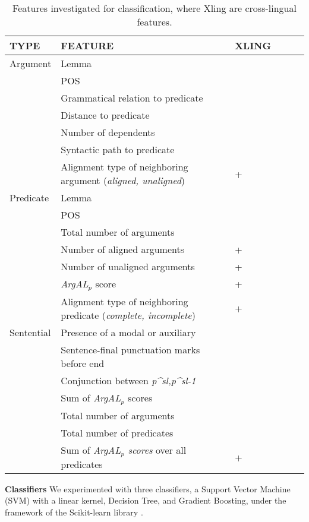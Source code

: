 \documentclass[11pt]{article}
\begin{document}
\begin {table}[h]
\begin{tabular}{@{}p{1.5cm}p{4.3cm}llrc@{}}
\hline
\tiny TYPE  & \tiny FEATURE & \tiny XLING \\
\hline
\small Argument &  \small Lemma\\
\small    & \small POS\\
\small   & \small Grammatical relation to predicate\\
\small      & \small Distance to predicate\\
\small      & \small Number of dependents\\
\small      & \small Syntactic path to predicate\\
\small       & \small Alignment type of neighboring argument ({\em aligned, unaligned}) & \tiny +\\
\hline
\small Predicate &  \small Lemma\\
\small     & \small POS\\
\small     & \small Total number of arguments\\
\small      & \small Number of aligned arguments & \tiny +\\
\small      & \small Number of unaligned arguments & \tiny +\\
\small      & \small \textit{ArgAL$_p$} score & \tiny +\\
\small    & \small Alignment type of neighboring predicate ({\em complete, incomplete}) & \tiny +\\
\hline
\small Sentential     & \small   Presence of a modal or auxiliary  \\
\small    & \small   Sentence-final punctuation marks before end \\
\small      & \small   Conjunction between  \small \textit{p^{sl},p^{sl}-1} \\
\small      & \small   Sum of  \small \textit{ArgAL$_p$} scores  \\
\small      & \small   Total number of arguments  \\
\small      & \small   Total number of predicates  \\
\small      & \small   Sum of  \small \textit{ArgAL$_p$ scores} over all predicates & \tiny +\\
\hline
\end{tabular}
\caption{Features investigated for classification, where Xling are cross-lingual features.}\label{features}
\end{table}

{\bf  \flushleft Classifiers}
We experimented with three classifiers, a Support Vector Machine (SVM) with a linear kernel, Decision Tree, and Gradient Boosting, under the framework of the Scikit-learn library \cite{scikit-learn}. 
 
\end{document}
